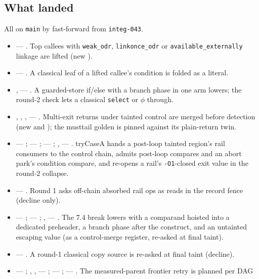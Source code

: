 \subsection*{What landed}
All on \texttt{main} by fast-forward from \texttt{integ-043}.
\begin{itemize}
  \item {} --- . Top callees with \texttt{weak\_odr},
  \texttt{linkonce\_odr} or \texttt{available\_externally} linkage are lifted (new
  ).
  \item {} --- . A classical leaf of a lifted callee's
  condition is folded as a literal.
  \item {},  --- . A guarded-store if/else with
  a branch phase in one arm lowers; the round-2 check lets a classical
  \texttt{select} or $\phi$ through.
  \item {}, , ,  ---
  . Multi-exit returns under tainted control are merged before detection (new
   and ); the musttail golden is pinned against its plain-return
  twin.
  \item {} --- ;  --- ;
   --- ; ,  ---
  . tryCaseA hands a post-loop tainted region's rail consumers to the control
  chain, admits post-loop compares and an abort park's condition compare, and re-opens a
  rail's \texttt{-O1}-closed exit value in the round-2 collapse.
  \item {} --- . Round 1 asks off-chain absorbed rail ops as
  reads in the record fence (decline only).
  \item {} --- ;  --- ;
  ,  --- . The 7.4 break lowers with a
  comparand hoisted into a dedicated preheader, a branch phase after the construct, and an
  untainted escaping value (as a control-merge register, re-asked at final taint).
  \item {} --- . A round-1 classical copy source is re-asked at
  final taint (decline).
  \item {} --- ; , ,
   --- ;  --- ;
   --- . The measured-parent frontier retry is planned per DAG

\end{itemize}

